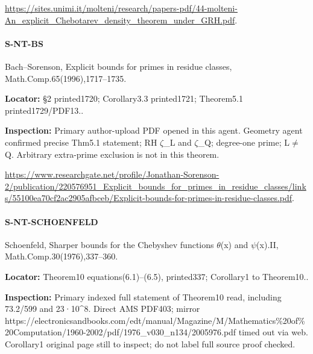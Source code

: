 \documentclass[11pt,a4paper]{article}
\begin{document}
\url{https://sites.unimi.it/molteni/research/papers-pdf/44-molteni-An_explicit_Chebotarev_density_theorem_under_GRH.pdf}.

\paragraph{S-NT-BS} Bach–\allowbreak{}Sorenson, Explicit bounds for primes in residue classes, Math.\allowbreak{}Comp.\allowbreak{}65(1996),1717–\allowbreak{}1735.

\textbf{Locator:} §2 printed1720; Corollary3.\allowbreak{}3 printed1721; Theorem5.\allowbreak{}1 printed1729/\allowbreak{}PDF13.\allowbreak{}.

\textbf{Inspection:} Primary author-upload PDF opened in this agent.\allowbreak{} Geometry agent confirmed precise Thm5.\allowbreak{}1 statement; RH \ensuremath{\zeta}\_\allowbreak{}L and \ensuremath{\zeta}\_\allowbreak{}Q; degree-one prime; L\ensuremath{\ne}Q.\allowbreak{} Arbitrary extra-prime exclusion is not in this theorem.\allowbreak{}

\url{https://www.researchgate.net/profile/Jonathan-Sorenson-2/publication/220576951_Explicit_bounds_for_primes_in_residue_classes/links/55100ea70cf2ac2905afbceb/Explicit-bounds-for-primes-in-residue-classes.pdf}.

\paragraph{S-NT-SCHOENFELD} Schoenfeld, Sharper bounds for the Chebyshev functions \ensuremath{\theta}(x) and \ensuremath{\psi}(x).\allowbreak{}II, Math.\allowbreak{}Comp.\allowbreak{}30(1976),337–\allowbreak{}360.

\textbf{Locator:} Theorem10 equations(6.\allowbreak{}1)–\allowbreak{}(6.\allowbreak{}5), printed337; Corollary1 to Theorem10.\allowbreak{}.

\textbf{Inspection:} Primary indexed full statement of Theorem10 read, including 73.\allowbreak{}2/\allowbreak{}599 and 23·10\textasciicircum{}8.\allowbreak{} Direct AMS PDF403; mirror https:\allowbreak{}/\allowbreak{}/\allowbreak{}electronicsandbooks.\allowbreak{}com/\allowbreak{}edt/\allowbreak{}manual/\allowbreak{}Magazine/\allowbreak{}M/\allowbreak{}Mathematics\%20of\%20Computation/\allowbreak{}1960-2002/\allowbreak{}pdf/\allowbreak{}1976\_\allowbreak{}v030\_\allowbreak{}n134/\allowbreak{}2005976.\allowbreak{}pdf timed out via web.\allowbreak{} Corollary1 original page still to inspect; do not label full source proof checked.\allowbreak{}
\end{document}
